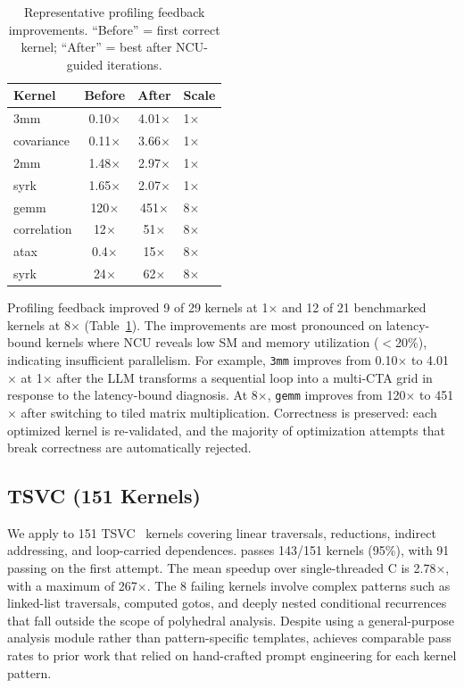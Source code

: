 \begin{table}[t]
  \caption{Representative profiling feedback improvements.
    ``Before'' = first correct kernel; ``After'' = best after NCU-guided iterations.}
  \label{tab:profiling}
  \centering\small
  \begin{tabular}{lccl}
    \toprule
    \textbf{Kernel} & \textbf{Before} & \textbf{After} & \textbf{Scale} \\
    \midrule
    3mm         & 0.10$\times$ & 4.01$\times$ & 1$\times$ \\
    covariance  & 0.11$\times$ & 3.66$\times$ & 1$\times$ \\
    2mm         & 1.48$\times$ & 2.97$\times$ & 1$\times$ \\
    syrk        & 1.65$\times$ & 2.07$\times$ & 1$\times$ \\
    \midrule
    gemm        & 120$\times$  & 451$\times$  & 8$\times$ \\
    correlation & 12$\times$   & 51$\times$   & 8$\times$ \\
    atax        & 0.4$\times$  & 15$\times$   & 8$\times$ \\
    syrk        & 24$\times$   & 62$\times$   & 8$\times$ \\
    \bottomrule
  \end{tabular}
\end{table}

Profiling feedback improved 9 of 29 kernels at 1$\times$ and 12 of 21 benchmarked kernels at 8$\times$ (Table~\ref{tab:profiling}).
The improvements are most pronounced on latency-bound kernels where NCU reveals low SM and memory utilization ($<$20\%), indicating insufficient parallelism.
For example, \texttt{3mm} improves from 0.10$\times$ to 4.01$\times$ at 1$\times$ after the LLM transforms a sequential loop into a multi-CTA grid in response to the latency-bound diagnosis.
At 8$\times$, \texttt{gemm} improves from 120$\times$ to 451$\times$ after switching to tiled matrix multiplication.
Correctness is preserved: each optimized kernel is re-validated, and the majority of optimization attempts that break correctness are automatically rejected.

\subsection{TSVC (151 Kernels)}

We apply \sysname to 151 TSVC~\cite{callahan1988tsvc} kernels covering linear traversals, reductions, indirect addressing, and loop-carried dependences.
\sysname passes 143/151 kernels (95\%), with 91 passing on the first attempt.
The mean speedup over single-threaded C is 2.78$\times$, with a maximum of 267$\times$.
The 8 failing kernels involve complex patterns such as linked-list traversals, computed gotos, and deeply nested conditional recurrences that fall outside the scope of polyhedral analysis. Despite using a general-purpose analysis module rather than pattern-specific templates, \sysname achieves comparable pass rates to prior work that relied on hand-crafted prompt engineering for each kernel pattern.

